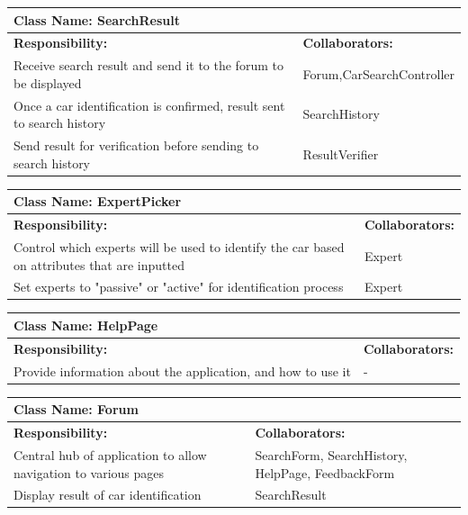 \documentclass[12pt]{article}
\begin{document}
	\begin{table}[ht]
		\centering
		\begin{tabular}{|p{5cm}|p{5cm}|}
		\hline
		 \multicolumn{2}{|l|}{\textbf{Class Name:} SearchResult} \\
		\hline
		\textbf{Responsibility:} & \textbf{Collaborators:} \\
		\hline
		Receive search result and send it to the forum to be displayed  & Forum,CarSearchController\\
		\hline
		Once a car identification is confirmed, result sent to search history & SearchHistory\\
		\hline
		Send result for verification before sending to search history & ResultVerifier\\
		\hline
		\end{tabular}
	\end{table}

	\begin{table}[ht]
		\centering
		\begin{tabular}{|p{5cm}|p{5cm}|}
		\hline
		 \multicolumn{2}{|l|}{\textbf{Class Name:} ExpertPicker} \\
		\hline
		\textbf{Responsibility:} & \textbf{Collaborators:} \\
		\hline
		Control which experts will be used to identify the car based on attributes that are inputted & Expert\\
		\hline
		Set experts to "passive" or "active" for identification process & Expert\\
		\hline
		\end{tabular}
	\end{table}

	\begin{table}[ht]
		\centering
		\begin{tabular}{|p{5cm}|p{5cm}|}
			\hline
			\multicolumn{2}{|l|}{\textbf{Class Name:} HelpPage} \\
			\hline
			\textbf{Responsibility:} & \textbf{Collaborators:} \\
			\hline
			Provide information about the application, and how to use it & -\\
			\hline
		\end{tabular}
	\end{table}

	\begin{table}[ht]
		\centering
		\begin{tabular}{|p{5cm}|p{5cm}|}
			\hline
			\multicolumn{2}{|l|}{\textbf{Class Name:} Forum} \\
			\hline
			\textbf{Responsibility:} & \textbf{Collaborators:} \\
			\hline
			Central hub of application to allow navigation to various pages & SearchForm, SearchHistory, HelpPage, FeedbackForm\\
			\hline
			Display result of car identification & SearchResult\\
			\hline
		\end{tabular}
	\end{table}
\end{document}
